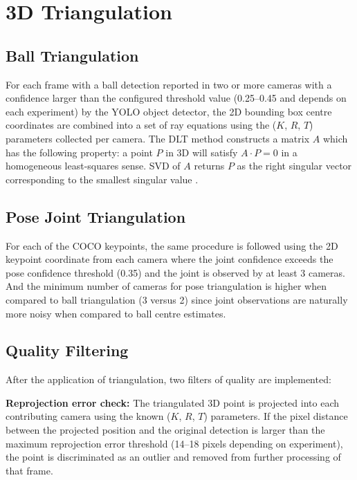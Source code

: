 \section{3D Triangulation}

\subsection{Ball Triangulation}

For each frame with a ball detection reported in two or more cameras with a confidence larger than the configured threshold value (0.25--0.45 and depends on each experiment) by the YOLO object detector, the 2D bounding box centre coordinates are combined into a set of ray equations using the ($K$, $R$, $T$) parameters collected per camera. The DLT method constructs a matrix $A$ which has the following property: a point $P$ in 3D will satisfy $A \cdot P = 0$ in a homogeneous least-squares sense. SVD of $A$ returns $P$ as the right singular vector corresponding to the smallest singular value \cite{ref1}.

\subsection{Pose Joint Triangulation}

For each of the COCO keypoints, the same procedure is followed using the 2D keypoint coordinate from each camera where the joint confidence exceeds the pose confidence threshold (0.35) and the joint is observed by at least 3 cameras. And the minimum number of cameras for pose triangulation is higher when compared to ball triangulation (3 versus 2) since joint observations are naturally more noisy when compared to ball centre estimates.

\subsection{Quality Filtering}

After the application of triangulation, two filters of quality are implemented:

\textbf{Reprojection error check:} The triangulated 3D point is projected into each contributing camera using the known ($K$, $R$, $T$) parameters. If the pixel distance between the projected position and the original detection is larger than the maximum reprojection error threshold (14--18 pixels depending on experiment), the point is discriminated as an outlier and removed from further processing of that frame.

